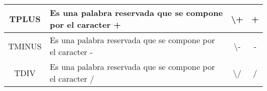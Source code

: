 \documentclass[12pt,a4paper, landscape]{article}
\theoremstyle{mytheor}
\begin{document}
\begin{longtable}[c]{|c|c|c|c|}
TPLUS        & \multicolumn{1}{l|}{Es una palabra reservada que se compone por el caracter +}                                                                                                                                                                                                                                                                                                                              & \textbackslash{}+                                                   & +                                                                                                                                                                                                                                                \\ \hline
TMINUS       & \multicolumn{1}{l|}{Es una palabra reservada que se compone por el caracter -}                                                                                                                                                                                                                                                                                                                              & \textbackslash{}-                                                   & -                                                                                                                                                                                                                                                \\ \hline
TDIV         & \multicolumn{1}{l|}{Es una palabra reservada que se compone por el caracter /}                                                                                                                                                                                                                                                                                                                              & \textbackslash{}/                                                   & /                                                                                                                                                                                                                                                \\ \hline


\end{longtable}
\end{document}
